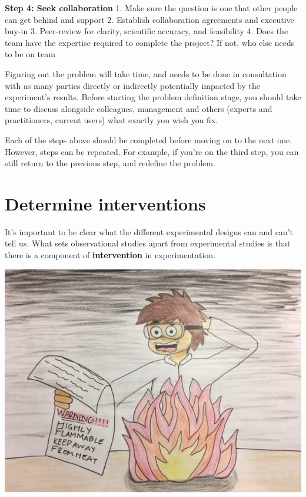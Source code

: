\documentclass[]{book}
\begin{document}
\textbf{Step 4: Seek collaboration}
1. Make sure the question is one that other people can get behind and support
2. Establish collaboration agreements and executive buy-in
3. Peer-review for clarity, scientific accuracy, and feasibility
4. Does the team have the expertise required to complete the project? If not, who else needs to be on team

Figuring out the problem will take time, and needs to be done in consultation with as many parties directly or indirectly potentially impacted by the experiment's results. Before starting the problem definition stage, you should take time to discuss alongside colleagues, management and others (experts and practitioners, current users) what exactly you wish you fix.

Each of the steps above should be completed before moving on to the next one. However, steps can be repeated. For example, if you're on the third step, you can still return to the previous step, and redefine the problem.

\hypertarget{determine-interventions}{%
\section{Determine interventions}\label{determine-interventions}}

It's important to be clear what the different experimental designs can and can't tell us. What sets observational studies apart from experimental studies is that there is a component of \textbf{intervention} in experimentation.

\includegraphics{fig/experimentation.jpg}
\end{document}
